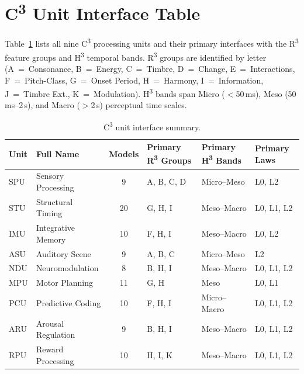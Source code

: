 \section{C\textsuperscript{3} Unit Interface Table}
\label{sec:c3-units}

Table~\ref{tab:c3-units} lists all nine C\textsuperscript{3} processing units
and their primary interfaces with the R\textsuperscript{3} feature groups and
H\textsuperscript{3} temporal bands.
R\textsuperscript{3} groups are identified by letter
(A~=~Consonance, B~=~Energy, C~=~Timbre, D~=~Change, E~=~Interactions,
 F~=~Pitch-Class, G~=~Onset Period, H~=~Harmony, I~=~Information,
 J~=~Timbre Ext., K~=~Modulation).
H\textsuperscript{3} bands span Micro ($<$50\,ms), Meso (50\,ms--2\,s),
and Macro ($>$2\,s) perceptual time scales.

\begin{table}[ht]
\centering
\caption{C\textsuperscript{3} unit interface summary.}
\label{tab:c3-units}
\renewcommand{\arraystretch}{1.15}
\begin{tabular}{@{}llclll@{}}
\toprule
\textbf{Unit} & \textbf{Full Name}
  & \textbf{Models}
  & \textbf{Primary R\textsuperscript{3} Groups}
  & \textbf{Primary H\textsuperscript{3} Bands}
  & \textbf{Primary Laws} \\
\midrule
SPU & Sensory Processing    &  9 & A, B, C, D & Micro--Meso  & L0, L2        \\
STU & Structural Timing     & 20 & G, H, I    & Meso--Macro  & L0, L1, L2    \\
IMU & Integrative Memory    & 10 & F, H, I    & Meso--Macro  & L0, L2        \\
ASU & Auditory Scene        &  9 & A, B, C    & Micro--Meso  & L2            \\
NDU & Neuromodulation       &  8 & B, H, I    & Meso--Macro  & L0, L1, L2    \\
MPU & Motor Planning        & 11 & G, H       & Meso         & L0, L1        \\
PCU & Predictive Coding     & 10 & F, H, I    & Micro--Macro & L0, L1, L2    \\
ARU & Arousal Regulation    &  9 & B, H, I    & Meso--Macro  & L0, L1, L2    \\
RPU & Reward Processing     & 10 & H, I, K    & Meso--Macro  & L0, L1, L2    \\
\bottomrule
\end{tabular}
\end{table}


